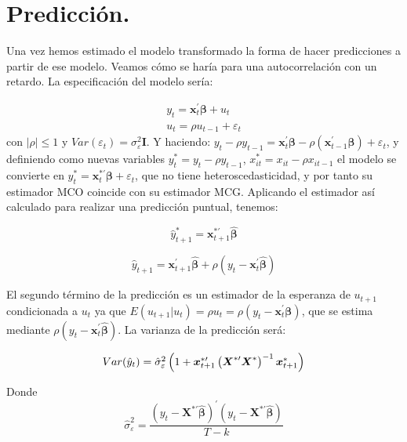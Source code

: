 \section{Predicci\'on.}

Una vez hemos estimado el modelo transformado la forma de hacer predicciones
a partir de ese modelo. Veamos c\'omo se har\'ia para una autocorrelaci\'on
con un retardo. La especificaci\'on del modelo ser\'ia:

\[
\begin{array}{c}
y_{t}=\boldsymbol{x}_{t}^{\prime}\boldsymbol{\beta}+u_{t}\\
u_{t}=\rho u_{t-1}+\varepsilon_{t}
\end{array}
\]
 con $\left|\rho\right|\leq1$ y $Var(\varepsilon_{t})=\sigma_{\varepsilon}^{2}\boldsymbol{I}$.
Y haciendo: $y_{t}-\rho y_{t-1}=\boldsymbol{x}_{t}^{\prime}\boldsymbol{\beta}-\rho\left(\boldsymbol{x}_{t-1}^{\prime}\boldsymbol{\beta}\right)+\varepsilon_{t}$,
y definiendo como nuevas variables $y_{t}^{*}=y_{t}-\rho y_{t-1}$,
$x_{it}^{*}=x_{it}-\rho x_{it-1}$ el modelo se convierte en $y_{t}^{*}=\boldsymbol{x}_{t}^{*\prime}\boldsymbol{\beta}+\varepsilon_{t}$,
que no tiene heteroscedasticidad, y por tanto su estimador MCO coincide
con su estimador MCG. Aplicando el estimador as\'i calculado para realizar
una predicci\'on puntual, tenemos:

\[
\hat{y}_{t+1}^{*}=\boldsymbol{x}_{t+1}^{*\prime}\hat{\boldsymbol{\beta}}
\]


\[
\hat{y}_{t+1}=\boldsymbol{x}_{t+1}^{\prime}\hat{\boldsymbol{\beta}}+\rho\left(y_{t}-\boldsymbol{x}_{t}^{\prime}\hat{\boldsymbol{\beta}}\right)
\]


El segundo t\'ermino de la predicci\'on es un estimador de la esperanza
de $u_{t+1}$ condicionada a $u_{t}$ ya que $E\left(u_{t+1}|u_{t}\right)=\rho u_{t}=\rho\left(y_{t}-\boldsymbol{x}_{t}^{\prime}\boldsymbol{\beta}\right)$,
que se estima mediante $\rho\left(y_{t}-\boldsymbol{x}_{t}^{\prime}\hat{\boldsymbol{\beta}}\right)$.
La varianza de la predicci\'on ser\'a:

\[
Var\mbox{\ensuremath{\left(\hat{y}_{t}\right)=\hat{\sigma}_{\varepsilon}^{2}\left(1+\boldsymbol{x}_{t+1}^{*\prime}\left(\boldsymbol{X}^{*\prime}\boldsymbol{X}^{*}\right)^{-1}\boldsymbol{x}_{t+1}^{*}\right)}}
\]


Donde 
\[
\hat{\sigma}_{\varepsilon}^{2}=\dfrac{\left(y_{t}-\boldsymbol{X}^{*\prime}\hat{\boldsymbol{\beta}}\right)^{\prime}\left(y_{t}-\boldsymbol{X}^{*\prime}\hat{\boldsymbol{\beta}}\right)}{T-k}
\]


